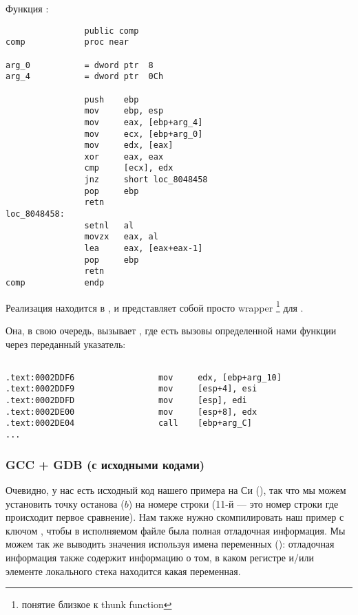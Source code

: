 Функция \comp:

\begin{lstlisting}
                public comp
comp            proc near

arg_0           = dword ptr  8
arg_4           = dword ptr  0Ch

                push    ebp
                mov     ebp, esp
                mov     eax, [ebp+arg_4]
                mov     ecx, [ebp+arg_0]
                mov     edx, [eax]
                xor     eax, eax
                cmp     [ecx], edx
                jnz     short loc_8048458
                pop     ebp
                retn
loc_8048458:
                setnl   al
                movzx   eax, al
                lea     eax, [eax+eax-1]
                pop     ebp
                retn
comp            endp
\end{lstlisting}

Реализация \qsort находится в , и представляет собой просто wrapper
\footnote{понятие близкое к \gls{thunk function}} для .

Она, в свою очередь, вызывает , где есть вызовы определенной нами функции через переданный указатель:


\begin{lstlisting}[caption=
(файл libc.so.6{,} версия glibc\EMDASH{}2.10.1)]

.text:0002DDF6                 mov     edx, [ebp+arg_10]
.text:0002DDF9                 mov     [esp+4], esi
.text:0002DDFD                 mov     [esp], edi
.text:0002DE00                 mov     [esp+8], edx
.text:0002DE04                 call    [ebp+arg_C]
...
\end{lstlisting}

\subsubsection{GCC + GDB (с исходными кодами)}

Очевидно, у нас есть исходный код нашего примера на Си (), 
так что мы можем установить точку останова ($b$) на номере строки
(11-й --- это номер строки где происходит первое сравнение).
Нам также нужно скомпилировать наш пример с ключом , чтобы в исполняемом файле была
полная отладочная информация.
Мы можем так же выводить значения используя имена переменных ():
отладочная информация также содержит информацию о том, в каком регистре и/или элементе локального
стека находится какая переменная.

